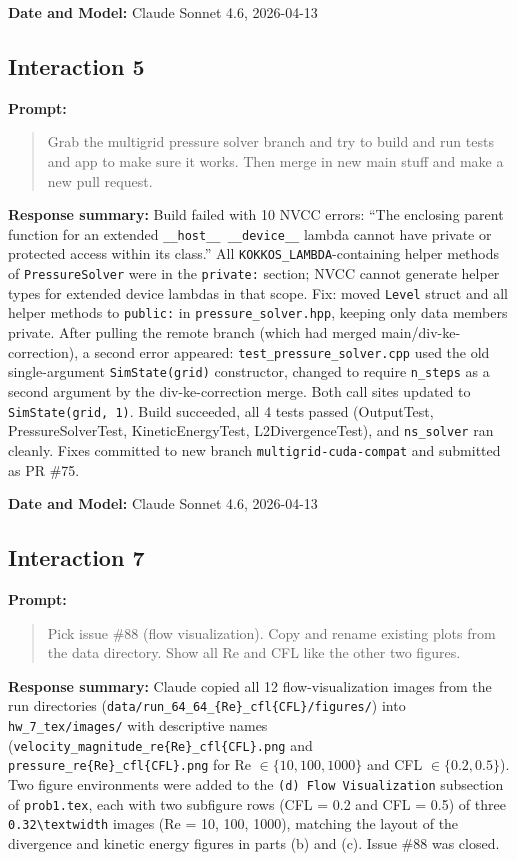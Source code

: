 \textbf{Date and Model:} Claude Sonnet 4.6, 2026-04-13

\subsection*{Interaction 5}

\textbf{Prompt:}
\begin{quote}
Grab the multigrid pressure solver branch and try to build and run tests and app to make sure it works. Then merge in new main stuff and make a new pull request.
\end{quote}

\textbf{Response summary:}
Build failed with 10 NVCC errors: ``The enclosing parent function for an extended \texttt{\_\_host\_\_ \_\_device\_\_} lambda cannot have private or protected access within its class.'' All \texttt{KOKKOS\_LAMBDA}-containing helper methods of \texttt{PressureSolver} were in the \texttt{private:} section; NVCC cannot generate helper types for extended device lambdas in that scope. Fix: moved \texttt{Level} struct and all helper methods to \texttt{public:} in \texttt{pressure\_solver.hpp}, keeping only data members private. After pulling the remote branch (which had merged main/div-ke-correction), a second error appeared: \texttt{test\_pressure\_solver.cpp} used the old single-argument \texttt{SimState(grid)} constructor, changed to require \texttt{n\_steps} as a second argument by the div-ke-correction merge. Both call sites updated to \texttt{SimState(grid, 1)}. Build succeeded, all 4 tests passed (OutputTest, PressureSolverTest, KineticEnergyTest, L2DivergenceTest), and \texttt{ns\_solver} ran cleanly. Fixes committed to new branch \texttt{multigrid-cuda-compat} and submitted as PR \#75.

\textbf{Date and Model:} Claude Sonnet 4.6, 2026-04-13

\subsection*{Interaction 7}

\textbf{Prompt:}
\begin{quote}
Pick issue \#88 (flow visualization). Copy and rename existing plots from the data directory. Show all Re and CFL like the other two figures.
\end{quote}

\textbf{Response summary:}
Claude copied all 12 flow-visualization images from the run directories (\texttt{data/run\_64\_64\_\{Re\}\_cfl\{CFL\}/figures/}) into \texttt{hw\_7\_tex/images/} with descriptive names (\texttt{velocity\_magnitude\_re\{Re\}\_cfl\{CFL\}.png} and \texttt{pressure\_re\{Re\}\_cfl\{CFL\}.png} for Re $\in \{10, 100, 1000\}$ and CFL $\in \{0.2, 0.5\}$). Two figure environments were added to the \texttt{(d) Flow Visualization} subsection of \texttt{prob1.tex}, each with two subfigure rows (CFL = 0.2 and CFL = 0.5) of three \texttt{0.32\textbackslash textwidth} images (Re = 10, 100, 1000), matching the layout of the divergence and kinetic energy figures in parts (b) and (c). Issue \#88 was closed.

